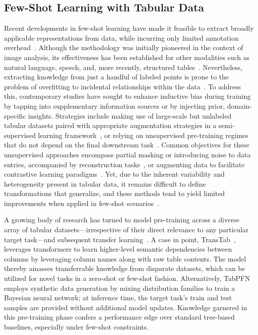 \subsection{Few-Shot Learning with Tabular Data} Recent developments in few-shot learning have made it feasible to extract broadly applicable representations from data, while incurring only limited annotation overhead~\cite{chen2018closer}. Although the methodology was initially pioneered in the context of image analysis, its effectiveness has been established for other modalities such as natural language, speech, and, more recently, structured tables~\cite{majumder2022few,nam2023stunt,schick2021exploiting}. Nevertheless, extracting knowledge from just a handful of labeled points is prone to the problem of overfitting to incidental relationships within the data~\cite{bartlett2021deep}. To address this, contemporary studies have sought to enhance inductive bias during training by tapping into supplementary information sources or by injecting prior, domain-specific insights. Strategies include making use of large-scale but unlabeled tabular datasets paired with appropriate augmentation strategies in a semi-supervised learning framework~\cite{ucar2021subtab,yoon2020vime}, or relying on unsupervised pre-training regimes that do not depend on the final downstream task~\cite{somepalli2021saint}. Common objectives for these unsupervised approaches encompass partial masking or introducing noise to data entries, accompanied by reconstruction tasks~\cite{arik2021tabnet,majmundar2022met}, or augmenting data to facilitate contrastive learning paradigms~\cite{bahri2022scarf,chen2020simple}. Yet, due to the inherent variability and heterogeneity present in tabular data, it remains difficult to define transformations that generalize, and these methods tend to yield limited improvements when applied in few-shot scenarios~\cite{nam2023stunt}.

A growing body of research has turned to model pre-training across a diverse array of tabular datasets—irrespective of their direct relevance to any particular target task—and subsequent transfer learning~\cite{zhang2023generative,levin2022transfer,zhu2023xtab}. A case in point, TransTab~\cite{wang2022transtab}, leverages transformers to learn higher-level semantic dependencies between columns by leveraging column names along with raw table contents. The model thereby amasses transferrable knowledge from disparate datasets, which can be utilized for novel tasks in a zero-shot or few-shot fashion. Alternatively, TabPFN~\cite{hollmann2022tabpfn} employs synthetic data generation by mixing distribution families to train a Bayesian neural network; at inference time, the target task’s train and test samples are provided without additional model updates. Knowledge garnered in this pre-training phase confers a performance edge over standard tree-based baselines, especially under few-shot constraints.

